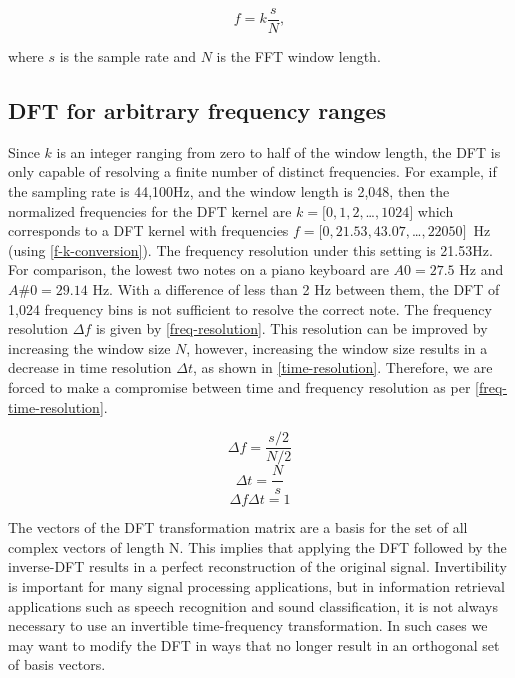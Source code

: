 \documentclass{ieeeaccess}
\begin{document}
\begin{equation}
 f= k\frac{s}{N} \label{f-k-conversion},
\end{equation}

where $s$ is the sample rate and $N$ is the FFT window length.



\subsection{DFT for arbitrary frequency ranges}
Since $k$ is an integer ranging from zero to half of the window length, the DFT is only capable of resolving a finite number of distinct frequencies. For example, if the sampling rate is 44,100Hz, and the window length is 2,048, then the normalized frequencies for the DFT kernel are $k=[0,1,2,$\ldots$,1024]$ which corresponds to a DFT kernel with frequencies  $f=[0,21.53,43.07,$\ldots$, 22050]$~Hz (using \eqref{f-k-conversion}).  The frequency resolution under this setting is 21.53Hz. For comparison, the lowest two notes on a piano keyboard are $A0=27.5$ Hz and $A\#0=29.14$ Hz. With a difference of less than 2 Hz between them, the DFT of 1,024 frequency bins is not sufficient to resolve the correct note. The frequency resolution $\Delta f$ is given by \eqref{freq-resolution}. This resolution can be improved by increasing the window size $N$, however, increasing the window size results in a decrease in time resolution $\Delta t$, as shown in \eqref{time-resolution}. Therefore, we are forced to make a compromise between time and frequency resolution as per \eqref{freq-time-resolution}.

\begin{equation}
 \Delta f = \frac{s/2}{N/2} \label{freq-resolution}
\end{equation}
\begin{equation}
 \Delta t = \frac{N}{s} \label{time-resolution}
\end{equation}
\begin{equation}
 \Delta f\Delta t = 1 \label{freq-time-resolution}
\end{equation}


The vectors of the DFT transformation matrix are a basis for the set of all complex vectors of length N. This implies that applying the DFT followed by the inverse-DFT results in a perfect reconstruction of the original signal. Invertibility is important for many signal processing applications, but in information retrieval applications such as speech recognition and sound classification, it is not always necessary to use an invertible time-frequency transformation. In such cases we may want to modify the DFT in ways that no longer result in an orthogonal set of basis vectors.
\end{document}
